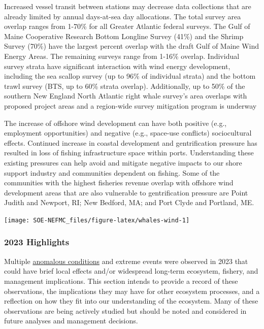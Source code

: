 \documentclass[
  10pt,
]{article}
\let\origfigure\figure
\let\endorigfigure\endfigure
\renewenvironment{figure}[1][2] {
    \expandafter\origfigure\expandafter[H]
} {
    \endorigfigure
}
\begin{document}
Increased vessel transit between stations may decrease data collections that are already limited by annual days-at-sea day allocations. The total survey area overlap ranges from 1-70\% for all Greater Atlantic federal surveys. The Gulf of Maine Cooperative Research Bottom Longline Survey (41\%) and the Shrimp Survey (70\%) have the largest percent overlap with the draft Gulf of Maine Wind Energy Areas. The remaining surveys range from 1-16\% overlap. Individual survey strata have significant interaction with wind energy development, including the sea scallop survey (up to 96\% of individual strata) and the bottom trawl survey (BTS, up to 60\% strata overlap). Additionally, up to 50\% of the southern New England North Atlantic right whale survey's area overlaps with proposed project areas and a region-wide survey mitigation program is underway

The increase of offshore wind development can have both positive (e.g., employment opportunities) and negative (e.g., space-use conflicts) sociocultural effects. Continued increase in coastal development and gentrification pressure has resulted in loss of fishing infrastructure space within ports. Understanding these existing pressures can help avoid and mitigate negative impacts to our shore support industry and communities dependent on fishing. Some of the communities with the highest fisheries revenue overlap with offshore wind development areas that are also vulnerable to gentrification pressure are Point Judith and Newport, RI; New Bedford, MA; and Port Clyde and Portland, ME.

\begin{figure}

{\centering \texttt{[image: SOE-NEFMC\_files/figure-latex/whales-wind-1]} 

}

\caption{Northern Right Whale persistent hotspots and Wind Energy Areas. Areas outlined in black show active or proposed wind energy leases.}\label{fig:whales-wind}
\end{figure}
\newpage

\hypertarget{highlights}{%
\subsubsection{2023 Highlights}\label{highlights}}

Multiple \href{https://noaa-edab.github.io/catalog/observation_synthesis.html}{anomalous conditions} and extreme events were observed in 2023 that could have brief local effects and/or widespread long-term ecosystem, fishery, and management implications. This section intends to provide a record of these observations, the implications they may have for other ecosystem processes, and a reflection on how they fit into our understanding of the ecosystem. Many of these observations are being actively studied but should be noted and considered in future analyses and management decisions.
\end{document}
